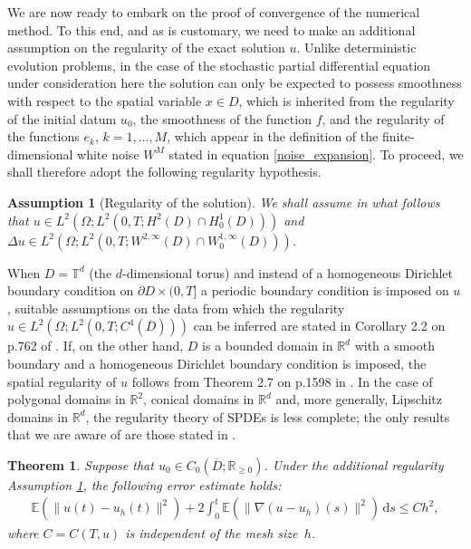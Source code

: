 \documentclass[12pt]{article}
\newtheorem{theorem}{Theorem}[section]
\newtheorem{assumption}{Assumption}[section]
\newcommand{\dd}{\,\mathrm{d}}
\begin{document}
{We are now ready to embark on the proof of convergence of the numerical method. To this end, and as is customary, we need to make an additional assumption on the regularity of the exact solution $u$.
Unlike deterministic evolution problems, in the case of the stochastic partial differential equation under consideration here the solution can only be expected to possess smoothness with respect to the spatial variable $x \in D$, which is inherited from the regularity of the initial datum $u_0$, the smoothness of the function $f$, and the regularity of the functions $e_k$, $k=1,\ldots,M$, which appear in the definition of the finite-dimensional white noise $W^M$ stated in equation \eqref{noise_expansion}. To proceed, we shall therefore adopt the following regularity hypothesis. 


\begin{assumption}[Regularity of the solution]\label{ass:reg}
    We shall assume in what follows that $u \in L^2(\Omega; L^2(0,T; H^2(D)\cap H^1_0(D)))$ 
    and $\Delta u \in L^2(\Omega; L^2(0,T;W^{2,\infty}(D)\cap W^{1,\infty}_0(D)))$.
\end{assumption}
   

When $D=\mathbb{T}^d$ (the $d$-dimensional torus) and instead of a homogeneous Dirichlet boundary condition on $\partial D \times (0,T]$ a periodic boundary condition is imposed on $u$, suitable assumptions on the data from which the regularity $u \in L^2(\Omega; L^2(0,T; C^4(\overline{D})))$ can be inferred are stated in Corollary 2.2 on p.762 of \cite{MR3057153}. 
If, on the other hand, $D$ is a bounded domain in $\mathbb{R}^d$ with a smooth boundary and a homogeneous Dirichlet boundary condition is imposed, the spatial regularity of $u$ follows from Theorem 2.7 on p.1598 in \cite{MR3340199}. In the case of polygonal domains in $\mathbb{R}^2$, conical domains in $\mathbb{R}^d$ and, more generally, Lipschitz domains in $\mathbb{R}^d$, the regularity theory of SPDEs is less complete; the only results that we are aware of are those stated in \cite{MR3004660,MR2875351,MR3109621,MR4001061,MR3757679,MR4483346}.

\begin{theorem}
\label{thm:error} Suppose that $u_0 \in C_0(\overline{D};\mathbb{R}_{\geq 0})$. Under the additional regularity Assumption \ref{ass:reg}, the following error estimate holds:
   \begin{align}\label{thm_error}
   \mathbb{E}(\|u(t) -u_h(t)\|^2) + 2 \int_0^t \mathbb{E}(\| \nabla (u -u_h)(s)\|^2) \dd s \leq C h^2 ,
\end{align}
where $C=C(T, u)$ is independent of the mesh size~$h$.
\end{theorem}

}
\end{document}
